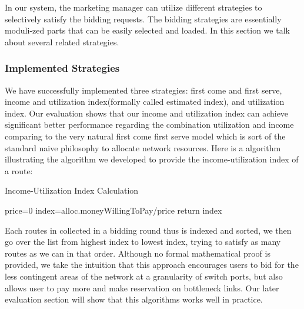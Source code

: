 \documentclass[a4paper,11pt,twocolumn]{article}
\begin{document}
In our system, the marketing manager can utilize different strategies to selectively satisfy the bidding requests. The bidding strategies are essentially moduli-zed parts that can be easily selected and loaded. In this section we talk about several related strategies.

\subsubsection{Implemented Strategies}

We have successfully implemented three strategies: first come and first serve, income and utilization index(formally called estimated index), and utilization index. Our evaluation shows that our income and utilization index can achieve significant better performance regarding the combination utilization and income comparing to the very natural first come first serve model which is sort of the standard naive philosophy to allocate network resources. Here is a algorithm   illustrating the algorithm we developed to provide the income-utilization index of a route: 

\providecommand{\SetAlgoLined}{\SetLine}
\providecommand{\DontPrintSemicolon}{\dontprintsemicolon}
\vspace{5mm}
\begin{algorithm}[H]
\caption{Income-Utilization Index Calculation}

\SetAlgoLined
 price=0\;
index=alloc.moneyWillingToPay/price\;
return index\;
\end{algorithm}


Each routes in collected in a bidding round thus is indexed and sorted, we then go over the list from highest index to lowest index, trying to satisfy as many routes as we can in that order.
Although no formal mathematical proof is provided, we take the  intuition that this approach encourages users to bid for the less contingent areas of the network at a granularity of switch ports, but also allows user to pay more and make reservation on bottleneck links. Our later evaluation section will show that this algorithms works well in practice.
\end{document}
